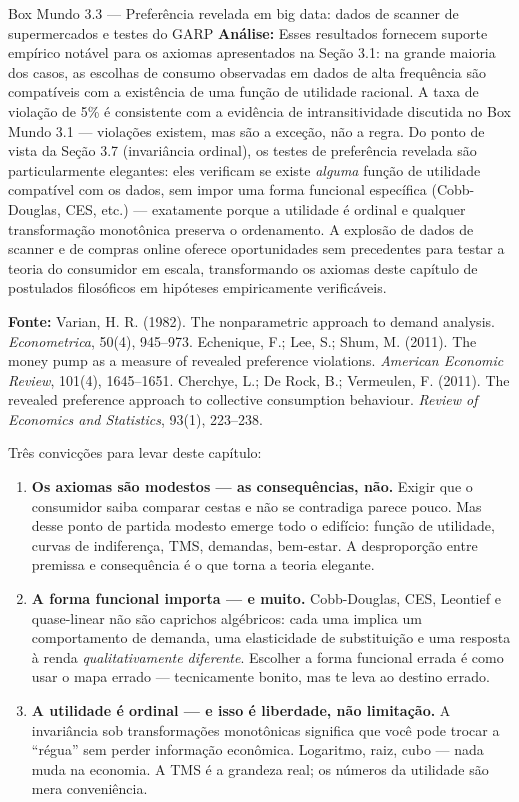 \documentclass[11pt,twoside,openright]{book}
\begin{document}
\begin{boxmundobox}{Box Mundo 3.3 — Preferência revelada em big data: dados de scanner de supermercados e testes do GARP}
\textbf{Análise:} Esses resultados fornecem suporte empírico notável
para os axiomas apresentados na Seção 3.1: na grande maioria dos casos,
as escolhas de consumo observadas em dados de alta frequência são
compatíveis com a existência de uma função de utilidade racional. A taxa
de violação de 5\% é consistente com a evidência de intransitividade
discutida no Box Mundo 3.1 --- violações existem, mas são a exceção, não
a regra. Do ponto de vista da Seção 3.7 (invariância ordinal), os testes
de preferência revelada são particularmente elegantes: eles verificam se
existe \emph{alguma} função de utilidade compatível com os dados, sem
impor uma forma funcional específica (Cobb-Douglas, CES, etc.) ---
exatamente porque a utilidade é ordinal e qualquer transformação
monotônica preserva o ordenamento. A explosão de dados de scanner e de
compras online oferece oportunidades sem precedentes para testar a
teoria do consumidor em escala, transformando os axiomas deste capítulo
de postulados filosóficos em hipóteses empiricamente verificáveis.

\textbf{Fonte:} Varian, H. R. (1982). The nonparametric approach to
demand analysis. \emph{Econometrica}, 50(4), 945--973. Echenique, F.;
Lee, S.; Shum, M. (2011). The money pump as a measure of revealed
preference violations. \emph{American Economic Review}, 101(4),
1645--1651. Cherchye, L.; De Rock, B.; Vermeulen, F. (2011). The
revealed preference approach to collective consumption behaviour.
\emph{Review of Economics and Statistics}, 93(1), 223--238.

\end{boxmundobox}

Três convicções para levar deste capítulo:

\begin{enumerate}
\def\labelenumi{\arabic{enumi}.}
\item
  \textbf{Os axiomas são modestos --- as consequências, não.} Exigir que
  o consumidor saiba comparar cestas e não se contradiga parece pouco.
  Mas desse ponto de partida modesto emerge todo o edifício: função de
  utilidade, curvas de indiferença, TMS, demandas, bem-estar. A
  desproporção entre premissa e consequência é o que torna a teoria
  elegante.
\item
  \textbf{A forma funcional importa --- e muito.} Cobb-Douglas, CES,
  Leontief e quase-linear não são caprichos algébricos: cada uma implica
  um comportamento de demanda, uma elasticidade de substituição e uma
  resposta à renda \emph{qualitativamente diferente}. Escolher a forma
  funcional errada é como usar o mapa errado --- tecnicamente bonito,
  mas te leva ao destino errado.
\item
  \textbf{A utilidade é ordinal --- e isso é liberdade, não limitação.}
  A invariância sob transformações monotônicas significa que você pode
  trocar a ``régua'' sem perder informação econômica. Logaritmo, raiz,
  cubo --- nada muda na economia. A TMS é a grandeza real; os números da
  utilidade são mera conveniência.
\end{enumerate}
\end{document}
